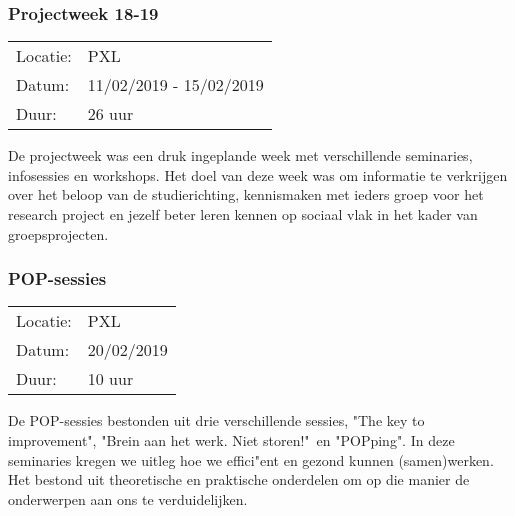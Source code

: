 \subsubsection{Projectweek 18-19}

\begin{tabular}{l l}
  Locatie: & PXL\\
  Datum: & 11/02/2019 - 15/02/2019\\
  Duur: & 26 uur
\end{tabular}

De projectweek was een druk ingeplande week met verschillende seminaries, infosessies en workshops. Het doel van deze week was om informatie te verkrijgen over het beloop van de studierichting, kennismaken met ieders groep voor het research project en jezelf beter leren kennen op sociaal vlak in het kader van groepsprojecten.

\subsubsection{POP\hyp{}sessies}

\begin{tabular}{l l}
  Locatie: & PXL\\
  Datum: & 20/02/2019\\
  Duur: & 10 uur
\end{tabular}

De POP\hyp{}sessies bestonden uit drie verschillende sessies, "The key to improvement", "Brein aan het werk. Niet storen!"\ en "POPping". In deze seminaries kregen we uitleg hoe we effici"ent en gezond kunnen (samen)werken. Het bestond uit theoretische en praktische onderdelen om op die manier de onderwerpen aan ons te verduidelijken.